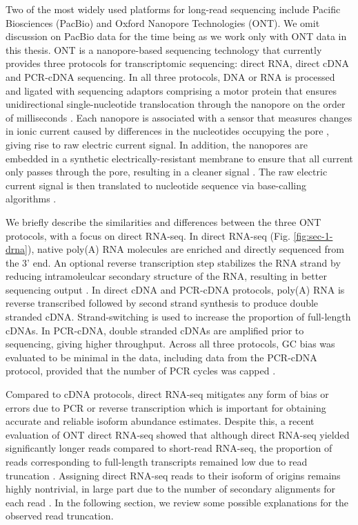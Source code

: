 Two of the most widely used platforms for long-read sequencing include Pacific Biosciences (PacBio) and Oxford Nanopore Technologies (ONT). We omit discussion on PacBio data for the time being as we work only with ONT data in this thesis. ONT is a nanopore-based sequencing technology that currently provides three protocols for transcriptomic sequencing: direct RNA, direct cDNA and PCR-cDNA sequencing. In all three protocols, DNA or RNA is processed and ligated with sequencing adaptors comprising a motor protein that ensures unidirectional single-nucleotide translocation through the nanopore on the order of milliseconds \cite{Jain2016}. Each nanopore is associated with a sensor that measures changes in ionic current caused by differences in the nucleotides occupying the pore \cite{Jain2016}, giving rise to raw electric current signal. In addition, the nanopores are embedded in a synthetic electrically-resistant membrane to ensure that all current only passes through the pore, resulting in a cleaner signal \cite{Wang2021}. The raw electric current signal is then translated to nucleotide sequence via base-calling algorithms \cite{Rang2018}. 

We briefly describe the similarities and differences between the three ONT protocols, with a focus on direct RNA-seq. In direct RNA-seq (Fig. \ref{fig:sec-1-drna}), native poly(A) RNA molecules are enriched and directly sequenced from the 3' end. An optional reverse transcription step stabilizes the RNA strand by reducing intramoleulcar secondary structure of the RNA, resulting in better sequencing output \cite{Garalde2018}. In direct cDNA and PCR-cDNA protocols, poly(A) RNA is reverse transcribed followed by second strand synthesis to produce double stranded cDNA. Strand-switching is used to increase the proportion of full-length cDNAs. In PCR-cDNA, double stranded cDNAs are amplified prior to sequencing, giving higher throughput. Across all three protocols, GC bias was evaluated to be minimal in the data, including data from the PCR-cDNA protocol, provided that the number of PCR cycles was capped \cite{ONT}. 

Compared to cDNA protocols, direct RNA-seq mitigates any form of bias or errors due to PCR or reverse transcription \cite{Garalde2018, Depledge2019} which is important for obtaining accurate and reliable isoform abundance estimates. Despite this, a recent evaluation of ONT direct RNA-seq showed that although direct RNA-seq yielded significantly longer reads compared to short-read RNA-seq, the proportion of reads corresponding to full-length transcripts remained low due to read truncation \cite{Soneson2019}. Assigning direct RNA-seq reads to their isoform of origins remains highly nontrivial, in large part due to the number of secondary alignments for each read \cite{Soneson2019}. In the following section, we review some possible explanations for the observed read truncation.   

